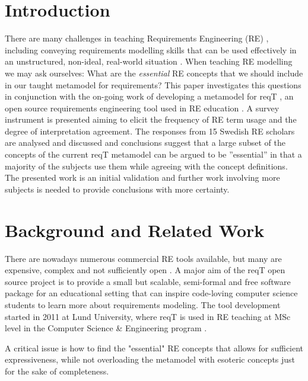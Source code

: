 \documentclass[a4paper]{llncs}
\begin{document}
\section{Introduction}
There are many challenges in teaching Requirements Engineering (RE) \cite{Memon2010, Regev2011}, including  conveying requirements modelling skills that can be used effectively in an unstructured, non-ideal, real-world situation \cite{Callele2006}. When teaching RE modelling we may ask ourselves: What are the \textit{essential} RE concepts that we should include in our taught metamodel for requirements? This paper investigates this questions in conjunction with the on-going work of developing a metamodel for reqT \cite{reqT}, an open source requirements engineering tool \cite{Regnell2013} used in RE education \cite{ets170}.
A survey instrument is presented aiming to elicit the frequency of RE term usage and the degree of interpretation agreement. The responses from 15 Swedish RE scholars are analysed and discussed and conclusions suggest that a large subset of the concepts of the current reqT metamodel can be argued to be ''essential'' in that a majority of the subjects use them while agreeing with the concept definitions. The presented work is an initial validation and further work involving more subjects is needed to provide conclusions with more certainty. 

\section{Background and Related Work}

There are nowadays numerous commercial RE tools available, but many are expensive, complex and not sufficiently open  \cite{Carillo2011}. A major aim of the reqT open source project is to provide a small but scalable, semi-formal and free software package for an educational setting \cite{Regnell2013} that can inspire code-loving computer science students to learn more about requirements modeling. The tool development started in 2011 at Lund University, where reqT is used in RE teaching at MSc level in the Computer Science \& Engineering program \cite{ets170}. 

A critical issue is how to find the "essential" RE concepts that allows for sufficient expressiveness, while not overloading the metamodel with esoteric concepts just for the sake of completeness. 
\end{document}
